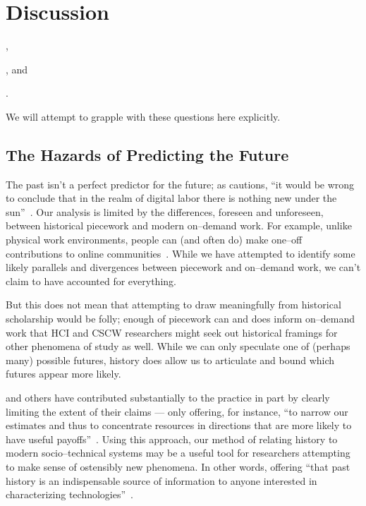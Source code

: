 \documentclass[trackingWork]{subfiles}
\begin{document}
\section{Discussion}
\begin{inlinelist}
  \item {},
  \item {}, and
  \item {}.
\end{inlinelist}
We will attempt to grapple with these questions here explicitly.


\subsection{The Hazards of Predicting the Future}\label{sec:perilousProblemsPredicting}
The past isn't a perfect predictor for the future;
as \citeauthor{scholz2012digital} cautions,
``it would be wrong to conclude that in the realm of digital labor there is nothing new under the sun''~\cite{scholz2012digital}.
Our analysis is limited by the differences, foreseen and unforeseen, between historical piecework and modern on--demand work.
For example, unlike physical work environments, people can (and often do) make one--off contributions to online communities~\cite{mcinnis2016one}.
While we have attempted to identify some likely parallels and divergences between piecework and on--demand work,
we can't claim to have accounted for everything.

But this does not mean that attempting to draw meaningfully from historical scholarship would be folly;
enough of piecework can and does inform on--demand work that
HCI and CSCW researchers might seek out historical framings for other phenomena of study as well.
While we can only speculate one of (perhaps many) possible futures, history does allow us to articulate and bound which futures appear more likely.

\citeauthor{rosenberg1994exploring} and others have contributed substantially to the practice in part by clearly limiting the extent of their claims
--- only offering, for instance,
``to narrow our estimates and thus to concentrate resources in directions that are more likely to have useful payoffs''~\cite{rosenberg1994exploring}.
Using this approach,
our method of relating history to modern socio--technical systems may be
a useful tool for researchers attempting
to make sense of ostensibly new phenomena.
In other words, offering ``that past history is an indispensable source of information
to anyone interested in characterizing technologies''~\cite{rosenberg1982inside}.
\end{document}
